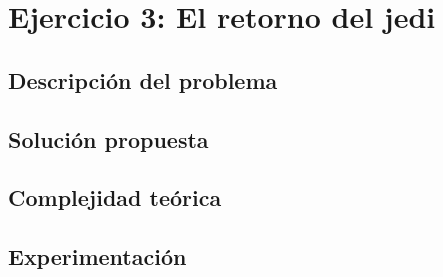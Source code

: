\section{Ejercicio 3: El retorno del jedi}

    \subsection{Descripción del problema}

    \subsection{Solución propuesta}

    \subsection{Complejidad teórica}

    \subsection{Experimentación}

